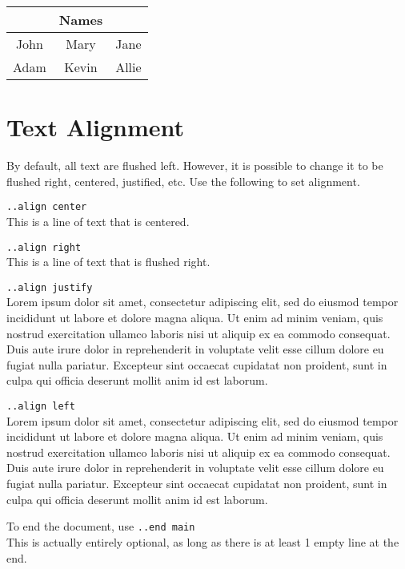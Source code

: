 \documentclass[12pt]{article}
\newcommand{\nl}{\\}
\numberwithin{equation}{section}
\begin{document}
\begin{flushleft}
\bigskip

\begin{tabular}{c|c|c}
& Names & \\
\hline
John & Mary & Jane \\
Adam & Kevin & Allie 
\end{tabular}

\newpage

\section{Text Alignment}

By default, all text are flushed left. However, it is possible to change it to be flushed right, centered, justified, etc. Use the following to set alignment.

\end{flushleft}

\begin{center}
\verb|..align center|\nl
This is a line of text that is centered.

\end{center}

\begin{flushright}
\verb|..align right|\nl
This is a line of text that is flushed right.

\end{flushright}
\verb|..align justify|\nl
Lorem ipsum dolor sit amet, consectetur adipiscing elit, sed do eiusmod tempor incididunt ut labore et dolore magna aliqua. Ut enim ad minim veniam, quis nostrud exercitation ullamco laboris nisi ut aliquip ex ea commodo consequat. Duis aute irure dolor in reprehenderit in voluptate velit esse cillum dolore eu fugiat nulla pariatur. Excepteur sint occaecat cupidatat non proident, sunt in culpa qui officia deserunt mollit anim id est laborum.

\medskip


\begin{flushleft}
\verb|..align left|\nl
Lorem ipsum dolor sit amet, consectetur adipiscing elit, sed do eiusmod tempor incididunt ut labore et dolore magna aliqua. Ut enim ad minim veniam, quis nostrud exercitation ullamco laboris nisi ut aliquip ex ea commodo consequat. Duis aute irure dolor in reprehenderit in voluptate velit esse cillum dolore eu fugiat nulla pariatur. Excepteur sint occaecat cupidatat non proident, sunt in culpa qui officia deserunt mollit anim id est laborum.

\bigskip
\bigskip
\bigskip

To end the document, use \verb|..end main|\nl
This is actually entirely optional, as long as there is at least 1 empty line at the end.

\end{flushleft}
\end{document}
